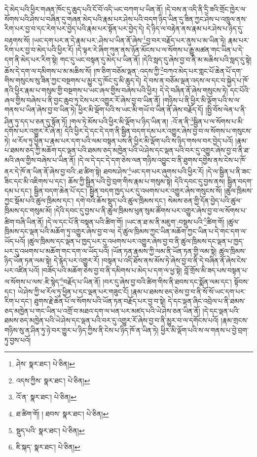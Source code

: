 དེ་མེད་པའི་ཕྱིར་གཞན་ཁོང་དུ་ཆུད་པའི་ངོ་བོ་འདི་ཡང་བཀག་པ་ཡིན་ནོ། །དེ་བས་ན་འདི་ནི་དྲི་ཟའི་གྲོང་ཁྱེར་ལ་སོགས་པའི་ཤེས་པ་བཞིན་དུ་གཞན་མེད་པའི་རྣམ་པར་ཤེས་པའི་བདག་ཉིད་ཡིན་དུ་ཟིན་ཀྱང་ཤེས་པ་འཁྲུལ་ནས་རིག་པར་བྱ་བ་དང་རེག་པར་བྱེད་པའི་རྣམ་པར་སྟོན་པར་བྱེད་དེ། དེ་ཉིད་ལ་བརྟེན་ནས་རྣམ་པར་ཤེས་པ་ཉིད་དུ་བརྟགས་སོ། །ཡང་དག་པར་ན་དེ་རྣམ་པར་:ཤེས་པ་ཡིན་ནོ་ཞེས་\footnote{ཤེས་  སྣར་ཐང་།  པེ་ཅིན། }བྱ་བར་བརྗོད་པར་ནུས་པ་མ་ཡིན་ཏེ། རྣམ་པར་རིག་པར་བྱ་བ་མེད་པའི་ཕྱིར་རོ། །དེ་ལྟར་རེ་ཞིག་ཀུན་ནས་ཉོན་མོངས་པ་ལ་སོགས་པ་རྒྱུ་མཚན་གང་ཡིན་པ་དེ་དག་ནི་མེད་པར་རིག་སྟེ། གང་དུ་ཡང་བསྟན་དུ་མེད་པ་ཡིན་ནོ། །དེའི་སླད་དུ་ཞེས་བྱ་བ་ནི་མ་མཆིས་པའི་སླད་དུ་སྟེ། ཆོས་དེ་དག་ལ་དམིགས་པ་མ་མཆིས་སོ། །ཁ་ཅིག་བཅོམ་ལྡན་:འདས་ཀྱི་\footnote{འདས་ཀྱིས་  སྣར་ཐང་།  པེ་ཅིན། }བཀའ་མེད་པར་གླང་པོ་ཆེན་པོ་དག་གིས་གསུངས་སུ་ཟིན་ཀྱང་བསྔགས་པ་མྱུར་དུ་ཁོང་དུ་མི་ཆུད་དེ། དེ་བས་ན་བཅོམ་ལྡན་འདས་ལ་དང་བ་སྐྱེད་པ་ཁོ་ནའི་ཕྱིར་རྣམ་པ་གསུམ་གྱི་བསྔགས་པ་ཡང་ཞལ་གྱིས་བཞེས་པའི་ཕྱིར། དེ་དེ་བཞིན་ནོ་ཞེས་གསུངས་ཏེ། དང་པོའི་ཞལ་གྱིས་བཞེས་པ་ནི་བྱང་ཆུབ་ཏུ་ངེས་པར་འགྱུར་རོ་ཞེས་བྱ་བ་ཡིན་ནོ། །གཉིས་པ་ནི་ཕྱིར་མི་ལྡོག་པའི་ས་ལ་གནས་པ་ཡིན་ཞེས་བྱ་བ་ཡིན་ཏེ། ཕྱིར་མི་ལྡོག་པའི་ས་ཡང་མི་གཡོ་བ་ཡིན་ནོ་ཞེས་བརྗོད་དོ། །སྤྱི་བོས་ལེན་པ་ནི་ཤིན་ཏུ་དད་པ་ཅན་དུ་སྟོན་ཏོ། །གལ་ཏེ་མོས་པའི་ཕྱིར་མི་ལྡོག་པ་ཉིད་ཡིན་ན། :འོ་ན་ནི་\footnote{འོ་ན་  སྣར་ཐང་།  པེ་ཅིན། }སྦྱིན་པ་ལ་སོགས་པ་མི་དགོས་པར་འགྱུར་རོ་ཞེ་ན། དེའི་ཕྱིར་དེ་དང་དེ་དག་ནི་སྦྱིན་བདག་དམ་པར་འགྱུར་ཞེས་བྱ་བ་ལ་སོགས་པ་གསུངས་ཏེ། ཕ་རོལ་ཏུ་ཕྱིན་པ་རྣམ་པར་དག་པའི་ལམ་བསྟན་པས་ནི་ཕྱིར་མི་ལྡོག་པའི་ས་ཉིད་གསལ་བར་བྱེད་པའོ། །རྣམ་པ་ཐམས་ཅད་ཀྱི་མཆོག་དང་ལྡན་པའི་ཐམས་ཅད་མཁྱེན་པའི་ཡེ་ཤེས་དང་ལྡན་པའི་བར་དུ་འགྱུར་ཞེས་བྱ་བ་ནི་ཐ་མའི་ཞལ་གྱིས་བཞེས་པ་ཡིན་ནོ། །དེ་ལ་དེ་དང་དེ་དག་ཅེས་ལན་གཉིས་འབྱུང་བ་ནི་ཐུགས་དགྱེས་ནས་ངེས་པ་ཁོ་ནར་དེ་ཁོ་ན་ཡིན་ནོ་ཞེས་བྱ་བའི་:ཐ་ཚིག་སྟེ། ཐབས་ཤེས་\footnote{ཐ་ཚིག་གོ། ། ཐབས་  སྣར་ཐང་།  པེ་ཅིན། }ཡང་དག་པར་ཞུགས་པའི་ཕྱིར་རོ། །དེ་ལ་སྦྱིན་པ་ནི་ཟང་ཟིང་དང་མི་འཇིགས་པ་དང་། ཆོས་ཀྱི་སྦྱིན་པའི་བྱེ་བྲག་གིས་རྣམ་པ་གསུམ་སྟེ། དེའི་དབང་དུ་བྱས་ནས། སྦྱིན་བདག་དམ་པ་དང་། སྦྱིན་བདག་ཆེན་པོ་དང་། སྦྱིན་བདག་ཁྱད་པར་དུ་འཕགས་པར་འགྱུར་ཞེས་གསུངས་སོ། །ཚུལ་ཁྲིམས་ཀྱང་སྡོམ་པའི་ཚུལ་ཁྲིམས་དང་། དགེ་བའི་ཆོས་སྡུད་པའི་ཚུལ་ཁྲིམས་དང་། སེམས་ཅན་གྱི་དོན་བྱེད་པའི་ཚུལ་ཁྲིམས་དང་གསུམ་མོ། །དེའི་དབང་དུ་བྱས་པ་ནི་ཚུལ་ཁྲིམས་ཕུན་སུམ་ཚོགས་པར་འགྱུར་ཞེས་བྱ་བ་ལ་སོགས་པ་ཚིག་བཞི་ཡིན་ནོ། །དེ་ལ་དང་པོ་ནི་བསྟན་པའི་ཚིག་གོ། །ཡང་ན་ཐ་མ་ནི་མཇུག་:བསྡུས་པའི་\footnote{སྡུད་པའི་  སྣར་ཐང་།  པེ་ཅིན། }ཚིག་གོ། །ཚུལ་ཁྲིམས་དང་ལྡན་པའི་མཆོག་ཏུ་འགྱུར་ཞེས་བྱ་བ་ལ། དེ་ཚུལ་ཁྲིམས་ཀྱང་ཡིན་མཆོག་ཀྱང་ཡིན་པ་དེ་གང་དག་ལ་ཡོད་པའོ། །ཚུལ་ཁྲིམས་དང་ལྡན་པ་ཁྱད་པར་དུ་འཕགས་པར་འགྱུར་ཞེས་བྱ་བ་ནི་ཚུལ་ཁྲིམས་དང་ལྡན་པ་ཁྱད་པར་དུ་འཕགས་པ་མཆོག་གང་དག་ལ་ཡོད་པའོ། །ཡོན་ཏན་རྣམས་ཀྱི་ལམ་ནི་ཡོན་ཏན་གྱི་ལམ་སྟེ། ཚུལ་ཁྲིམས་ཉིད་ཡོན་ཏན་ལམ་སྟེ། དེ་རྙེད་པར་འགྱུར་རོ། །བསྟན་པ་འདི་ཐོས་ནས་མོས་ཏེ་ཞེས་བྱ་བ་ནི་དེ་བཞིན་ནོ་ཞེས་ངེས་པར་འཛིན་པའོ། །བཟོད་པའི་མཆོག་ཅེས་བྱ་བ་ནི་དམིགས་པ་མེད་པ་དག་ལ་ཕྱ་སྟེ། བློ་གྲོས་མི་ཟད་པས་བསྟན་པ་ལ་སོགས་པ་ལས་:ཇི་སྙེད་\footnote{ཇི་སྐད་  སྣར་ཐང་།  པེ་ཅིན། }བརྗོད་པ་ཡིན་ནོ། །བར་དུ་ཞེས་བྱ་བའི་ཚིག་གིས་ནི་ཐབས་དང་སྨོན་ལམ་དང་། སྟོབས་དང་། ཡེ་ཤེས་ཀྱི་ཕ་རོལ་ཏུ་ཕྱིན་པ་དང་ལྡན་པར་གཟུང་ངོ། །རྣམ་པ་ཐམས་ཅད་ཅེས་བྱ་བ་ནི་སོ་སོ་ཡང་དག་པར་རིག་པ་དང་། ཐུགས་རྗེ་ཆེན་པོ་ལ་སོགས་པའི་ཡོན་ཏན་བརྗོད་པར་བྱ་བ་སྟེ། དེ་དང་ལྡན་ཞིང་འབྲེལ་པ་ནི་ཐམས་ཅད་མཁྱེན་པ་གང་ཡིན་པ་འགྲོ་བ་མཐའ་དག་ལ་ཕན་པར་མཛད་པའི་ཡེ་ཤེས་ཅན་ཡིན་ནོ། །དེ་དང་ལྡན་པའི་ཐམས་ཅད་མཁྱེན་པའི་ཡེ་ཤེས་དང་ལྡན་པའི་བར་དུ་འགྱུར་རོ་ཞེས་བྱ་བ་ནི་མྱུར་བ་ལ་དགོངས་པའོ། །རྣམ་གྲངས་གཉིས་སུ་ན་ཤིན་ཏུ་ཉེ་བར་གྱུར་པ་ཉིད་ཀྱིས་ནི་ངེས་པ་ཉིད་ཁོ་ན་ཡིན་ཏེ། ཕྱིར་མི་ལྡོག་པའི་ས་ལ་གནས་པ་བྱེ་བྲག་ཏུ་བྱས་པའོ། 